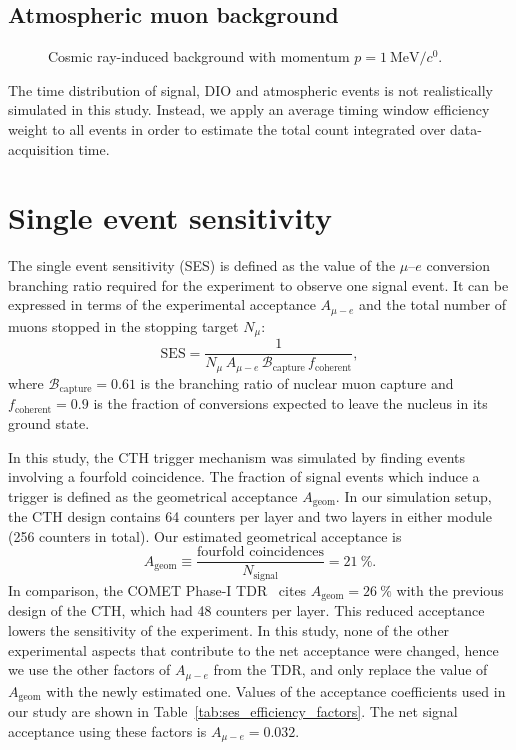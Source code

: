 \subsection{Atmospheric muon background}
\begin{figure}
    \centering
    
    \caption{Cosmic ray-induced background with momentum $p=\SI{1}{\MeV/\clight}$.}
    \label{fig:cosmic_bg_in_cydet}
\end{figure}

The time distribution of signal, DIO and atmospheric events is not realistically
simulated in this study. Instead, we apply an average timing window efficiency
weight to all events in order to estimate the total count integrated over
data-acquisition time.

\section{Single event sensitivity}
The single event sensitivity (SES) is defined as the value of the $\mu$--$e$
conversion branching ratio required for the experiment to observe one signal
event. It can be expressed in terms of the experimental acceptance $A_{\mu-e}$ and the
total number of muons stopped in the stopping target $N_\mu$:
\begin{equation}
    \mathrm{SES} = \frac{1}{N_\mu\,A_{\mu-e}\,\mathcal{B}_\mathrm{capture}\,f_\mathrm{coherent}},
\end{equation}
where $\mathcal{B}_\mathrm{capture} = 0.61$ is the branching ratio of nuclear
muon capture and $f_\mathrm{coherent} = 0.9$ is the fraction of conversions
expected to leave the nucleus in its ground state.


In this study, the CTH trigger mechanism was simulated by finding
events involving a fourfold coincidence. The fraction of signal events which
induce a trigger is defined as the geometrical acceptance $A_\mathrm{geom}$.
In our simulation setup, the CTH design contains 64 counters per layer and two
layers in either module (256 counters in total). Our estimated geometrical
acceptance is
$$
A_\mathrm{geom} \equiv \frac{\text{fourfold coincidences}}{N_\mathrm{signal}} = \SI{21}{\percent}.
$$
In comparison, the COMET Phase-I TDR~\cite{the_comet_collaboration_comet_2020}
cites $A_\mathrm{geom} = \SI{26}{\percent}$ with the previous design of the CTH,
which had 48 counters per layer. This reduced acceptance lowers the sensitivity
of the experiment. In this study, none of the other experimental aspects that
contribute to the net acceptance were changed, hence we use the other factors of
$A_{\mu-e}$ from the TDR, and only replace the value of $A_\mathrm{geom}$ with
the newly estimated one. Values of the acceptance coefficients used in our study
are shown in Table~\ref{tab:ses_efficiency_factors}. The net signal acceptance
using these factors is $A_{\mu-e} = 0.032$.

